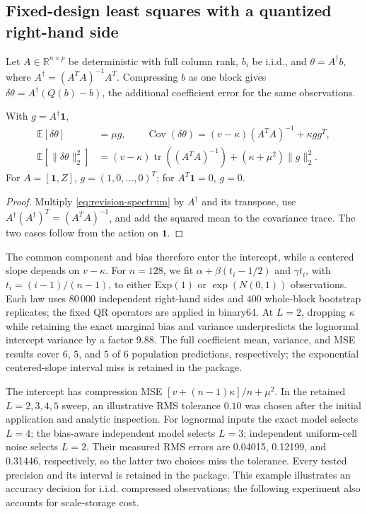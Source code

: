 \subsection{Fixed-design least squares with a quantized right-hand side}
\label{sec:revision-ls}
Let $A\in\mathbb R^{n\times p}$ be deterministic with full column rank,
$b_i$ be i.i.d., and $\theta=A^\dagger b$, where
$A^\dagger=(A^TA)^{-1}A^T$. Compressing $b$ as one block gives
$\delta\theta=A^\dagger(Q(b)-b)$, the additional coefficient error for
the same observations.
\begin{corollary}
\label{cor:revision-ls}
With $g=A^\dagger\mathbf1$,
\begin{align}
 \mathbb E[\delta\theta]&=\mu g,\qquad
 \operatorname{Cov}(\delta\theta)
 =(v-\kappa)(A^TA)^{-1}+\kappa gg^T,\label{eq:revision-ls-cov}\\
 \mathbb E[\|\delta\theta\|_2^2]
 &=(v-\kappa)\operatorname{tr}((A^TA)^{-1})
       +(\kappa+\mu^2)\|g\|_2^2.\label{eq:revision-ls-mse}
\end{align}
For $A=[\mathbf1,Z]$, $g=(1,0,\ldots,0)^T$; for $A^T\mathbf1=0$, $g=0$.
\end{corollary}
\begin{proof}
Multiply \eqref{eq:revision-spectrum} by $A^\dagger$ and its transpose,
use $A^\dagger(A^\dagger)^T=(A^TA)^{-1}$, and add the squared mean
to the covariance trace. The two cases follow from the action on $\mathbf1$.
\end{proof}
The common component and bias therefore enter the intercept, while a
centered slope depends on $v-\kappa$. For $n=128$, we fit
$\alpha+\beta(t_i-1/2)$ and $\gamma t_i$, with $t_i=(i-1)/(n-1)$,
to either Exp$(1)$ or $\exp(N(0,1))$ observations. Each law uses
$80\,000$ independent right-hand sides and $400$ whole-block bootstrap
replicates; the fixed QR operators are applied in binary64.
At $L=2$, dropping $\kappa$ while retaining the exact marginal bias and
variance underpredicts the lognormal intercept variance by a factor
9.88. The full coefficient mean, variance, and MSE results
cover $6$, $5$, and $5$ of $6$ population predictions, respectively;
the exponential centered-slope interval miss is retained in the package.

The intercept has compression MSE $[v+(n-1)\kappa]/n+\mu^2$.
In the retained $L=2,3,4,5$ sweep, an illustrative RMS tolerance $0.10$
was chosen after the initial application and analytic inspection.
For lognormal inputs the exact model selects $L=4$; the bias-aware
independent model selects $L=3$; independent uniform-cell noise selects
$L=2$. Their measured RMS errors are 0.04015, 0.12199, and 0.31446,
respectively, so the latter two choices miss the tolerance. Every tested
precision and its interval is retained in the package. This example
illustrates an accuracy decision for i.i.d. compressed observations;
the following experiment also accounts for scale-storage cost.
